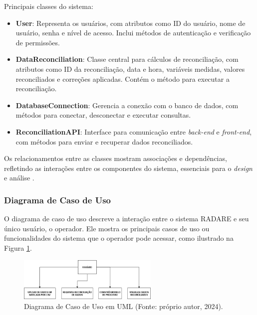 Principais classes do sistema:

\begin{itemize}
    \item \textbf{User}: Representa os usuários, com atributos como ID do usuário, nome de usuário, senha e nível de acesso. Inclui métodos de autenticação e verificação de permissões.
    
    \item \textbf{DataReconciliation}: Classe central para cálculos de reconciliação, com atributos como ID da reconciliação, data e hora, variáveis medidas, valores reconciliados e correções aplicadas. Contém o método para executar a reconciliação.
    
    \item \textbf{DatabaseConnection}: Gerencia a conexão com o banco de dados, com métodos para conectar, desconectar e executar consultas.
    
    \item \textbf{ReconciliationAPI}: Interface para comunicação entre \textit{back-end} e \textit{front-end}, com métodos para enviar e recuperar dados reconciliados.
\end{itemize}

Os relacionamentos entre as classes mostram associações e dependências, refletindo as interações entre os componentes do sistema, essenciais para o \textit{design} e análise \cite{softwareenguml}.

\subsubsection{Diagrama de Caso de Uso}

O diagrama de caso de uso descreve a interação entre o sistema RADARE e seu único usuário, o operador. Ele mostra os principais casos de uso ou funcionalidades do sistema que o operador pode acessar, como ilustrado na Figura \ref{fig:UseCaseDiagram}.


\begin{figure}[htbp!]
	\centering
        \includegraphics[width=0.6\textwidth]{figuras/DiagramaCasodeUso.drawio.png}
	\caption{Diagrama de Caso de Uso em UML  (Fonte: próprio autor, 2024).}
	\label{fig:UseCaseDiagram}
\end{figure}

